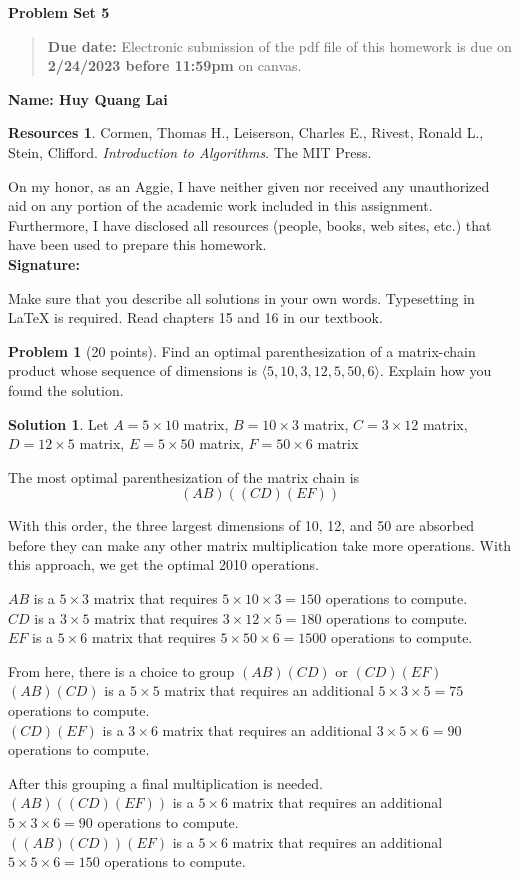 \documentclass{article}
\theoremstyle{definition}
\newtheorem{problem}{Problem}
\newtheorem*{solution}{Solution}
\newtheorem*{resources}{Resources}
\newcommand{\name}[1]{\noindent\textbf{Name: #1}}
\newcommand{\honor}{\noindent On my honor, as an Aggie, I have neither
  given nor received any unauthorized aid on any portion of the
  academic work included in this assignment. Furthermore, I have
  disclosed all resources (people, books, web sites, etc.) that have
  been used to prepare this homework. \\[1ex]
 \textbf{Signature:} \underline{\hspace*{5cm}} }
\newcommand{\problemset}[1]{\begin{center}\textbf{Problem Set
      #1}\end{center}}
\newcommand{\duedate}[1]{\begin{quote}\textbf{Due date:} Electronic
    submission of the pdf file of this homework is due on
    \textbf{#1} on canvas. \end{quote} }
\begin{document}
\problemset{5}
\duedate{2/24/2023 before 11:59pm}
\name{Huy Quang Lai}
\begin{resources} Cormen, Thomas H., Leiserson, Charles E., Rivest, Ronald L., Stein, Clifford. \textit{Introduction to Algorithms}. The MIT Press.
\end{resources}
\honor

\newpage
Make sure that you describe all solutions in your own
words. Typesetting in \LaTeX{} is required. Read
chapters 15 and 16 in our textbook. 

\begin{problem}[20 points]
  Find an optimal parenthesization of a matrix-chain product whose
  sequence of dimensions is $\langle 5, 10, 3, 12, 5, 50, 6\rangle$. 
  Explain how you found the solution.
\end{problem}
\begin{solution}
Let $A=5\times10$ matrix,
$B=10\times3$ matrix,
$C=3\times12$ matrix,
$D=12\times5$ matrix,
$E=5\times50$ matrix,
$F=50\times6$ matrix

\noindent
The most optimal parenthesization of the matrix chain is
\[(AB)\left((CD)(EF)\right)\]
\end{solution}

\noindent
With this order, the three largest dimensions of 10, 12, and 50 are absorbed before they can make any other matrix multiplication take more operations. With this approach, we get the optimal 2010 operations.

\noindent
$AB$ is a $5\times3$ matrix that requires $5\times10\times3=150$ operations to compute.\\
$CD$ is a $3\times5$ matrix that requires $3\times12\times5=180$ operations to compute.\\
$EF$ is a $5\times6$ matrix that requires $5\times50\times6=1500$ operations to compute.

\noindent
From here, there is a choice to group $(AB)(CD)$ or $(CD)(EF)$\\
$(AB)(CD)$ is a $5\times5$ matrix that requires an additional $5\times3\times5=75$ operations to compute.\\
$(CD)(EF)$ is a $3\times6$ matrix that requires an additional $3\times5\times6=90$ operations to compute.

\noindent
After this grouping a final multiplication is needed.\\
$(AB)((CD)(EF))$ is a $5\times6$ matrix that requires an additional $5\times3\times6=90$ operations to compute.\\
$((AB)(CD))(EF)$ is a $5\times6$ matrix that requires an additional $5\times5\times6=150$ operations to compute.
\end{document}

